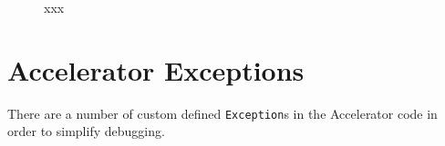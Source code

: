 \begin{figure}[h!]
  \begin{center}
    
    \caption{xxx}
    \label{fig:classes}
  \end{center}
\end{figure}



\section{Accelerator Exceptions}
There are a number of custom defined \texttt{Exception}s in the
Accelerator code in order to simplify debugging.




